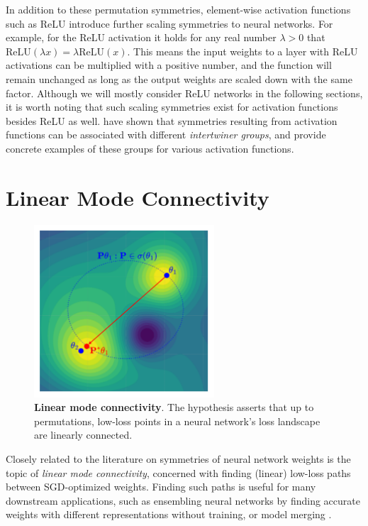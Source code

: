 In addition to these permutation symmetries, element-wise activation functions such as ReLU introduce further scaling symmetries to neural networks. For example, for the ReLU activation it holds for any real number $\lambda > 0$ that $\text{ReLU}(\lambda x) = \lambda \text{ReLU}(x)$. This means the input weights to a layer with ReLU activations can be multiplied with a positive number, and the function will remain unchanged as long as the output weights are scaled down with the same factor. Although we will mostly consider ReLU networks in the following sections, it is worth noting that such scaling symmetries exist for activation functions besides ReLU as well. \citep{godfreySymmetriesDeepLearning2022} have shown that symmetries resulting from activation functions can be associated with different \textit{intertwiner groups}, and provide concrete examples of these groups for various activation functions. 

\section{Linear Mode Connectivity}

\begin{figure}[t!]
    \centering
    \includegraphics[width=0.6\textwidth]{figures/mode_connectivity.drawio.pdf}
    \caption{\label{fig:mode_conn}\textbf{Linear mode connectivity}. The hypothesis asserts that up to permutations, low-loss points in a neural network's loss landscape are linearly connected.}    
\end{figure}


Closely related to the literature on symmetries of neural network weights is the topic of \textit{linear mode connectivity}, concerned with finding (linear) low-loss paths between SGD-optimized weights. Finding such paths is useful for many downstream applications, such as ensembling neural networks \citep{garipovLossSurfacesMode2018a} by finding accurate weights with different representations without training, or model merging \citep{stoicaZipItMergingModels2024}.

